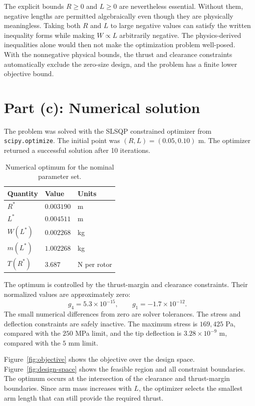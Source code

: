 \documentclass[11pt]{article}
\begin{document}
The explicit bounds $R\geq0$ and $L\geq0$ are nevertheless essential. Without them, negative lengths are permitted algebraically even though they are physically meaningless. Taking both $R$ and $L$ to large negative values can satisfy the written inequality forms while making $W\propto L$ arbitrarily negative. The physics-derived inequalities alone would then not make the optimization problem well-posed. With the nonnegative physical bounds, the thrust and clearance constraints automatically exclude the zero-size design, and the problem has a finite lower objective bound.

\section{Part (c): Numerical solution}

The problem was solved with the SLSQP constrained optimizer from
\texttt{scipy.optimize}. The initial point was $(R,L)=(0.05,0.10)$ m. The
optimizer returned a successful solution after 10 iterations.

\begin{table}[h]
\centering
\caption{Numerical optimum for the nominal parameter set.}
\label{tab:nominal-result}
\begin{tabular}{lll}
\toprule
Quantity & Value & Units \\
\midrule
$R^*$ & $0.003190$ & m \\
$L^*$ & $0.004511$ & m \\
$W(L^*)$ & $0.002268$ & kg \\
$m(L^*)$ & $1.002268$ & kg \\
$T(R^*)$ & $3.687$ & N per rotor \\
\bottomrule
\end{tabular}
\end{table}

The optimum is controlled by the thrust-margin and clearance constraints. Their
normalized values are approximately zero:
\begin{equation}
 g_4=5.3\times10^{-15}, \qquad g_1=-1.7\times10^{-12}.
\end{equation}
The small numerical differences from zero are solver tolerances. The stress and
deflection constraints are safely inactive. The maximum stress is
$169{,}425$ Pa, compared with the $250$ MPa limit, and the tip deflection is
$3.28\times10^{-9}$ m, compared with the $5$ mm limit.

Figure~\ref{fig:objective} shows the objective over the design space. Figure~\ref{fig:design-space}
shows the feasible region and all constraint boundaries. The optimum occurs at
the intersection of the clearance and thrust-margin boundaries. Since arm mass
increases with $L$, the optimizer selects the smallest arm length that can still
provide the required thrust.
\end{document}
